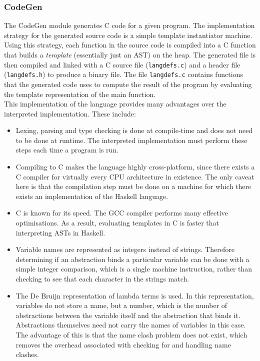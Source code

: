 \documentclass{article}
\begin{document}
\subsubsection{CodeGen}
The CodeGen module generates C code for a given program. The implementation strategy for the generated source code is a simple template instantiator machine. Using this strategy, each function in the source code is compiled into a C function that builds a \emph{template} (essentially just an AST) on the heap. The generated file is then compiled and linked with a C source file (\texttt{langdefs.c}) and a header file (\texttt{langdefs.h}) to produce a binary file. The file \texttt{langdefs.c} contains functions that the generated code uses to compute the result of the program by evaluating the template representation of the main function.
\\\indent This implementation of the language provides many advantages over the interpreted implementation. These include:
\begin{itemize}
    \item Lexing, parsing and type checking is done at compile-time and does not need to be done at runtime. The interpreted implementation must perform these steps each time a program is run.
    \item Compiling to C makes the language highly cross-platform, since there exists a C compiler for virtually every CPU architecture in existence. The only caveat here is that the compilation step must be done on a machine for which there exists an implementation of the Haskell language.
    \item C is known for its speed. The GCC compiler performs many effective optimisations. As a result, evaluating templates in C is faster that interpreting ASTs in Haskell.
    \item Variable names are represented as integers instead of strings. Therefore determining if an abstraction binds a particular variable can be done with a simple integer comparison, which is a single machine instruction, rather than checking to see that each character in the strings match.
    \item The De Bruijn representation of lambda terms is used. In this representation, variables do not store a name, but a number, which is the number of abstractions between the variable itself and the abstraction that binds it. Abstractions themselves need not carry the names of variables in this case. The advantage of this is that the name clash problem does not exist, which removes the overhead associated with checking for and handling name clashes.
\end{itemize}
\end{document}
